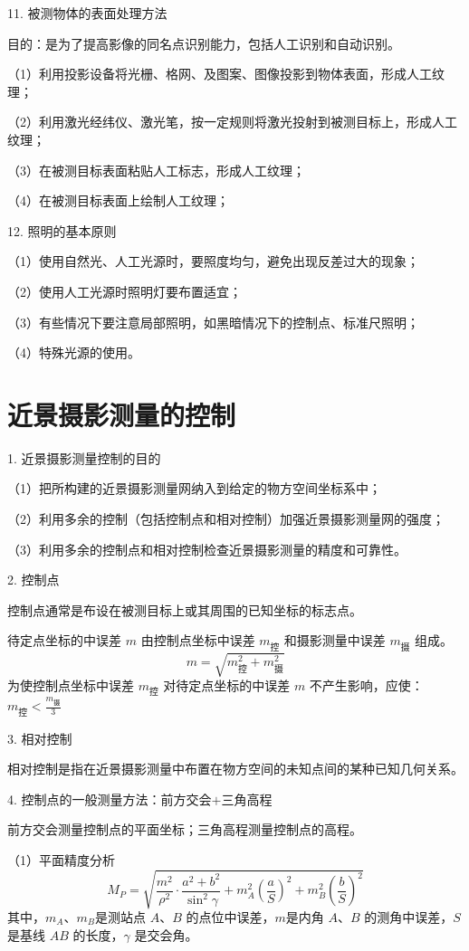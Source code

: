 \documentclass[a4paper]{ctexart}
\begin{document}
11. 被测物体的表面处理方法

目的：是为了提高影像的同名点识别能力，包括人工识别和自动识别。

（1）利用投影设备将光栅、格网、及图案、图像投影到物体表面，形成人工纹理；

（2）利用激光经纬仪、激光笔，按一定规则将激光投射到被测目标上，形成人工纹理；

（3）在被测目标表面粘贴人工标志，形成人工纹理；

（4）在被测目标表面上绘制人工纹理；

12. 照明的基本原则

（1）使用自然光、人工光源时，要照度均匀，避免出现反差过大的现象； 

（2）使用人工光源时照明灯要布置适宜；

（3）有些情况下要注意局部照明，如黑暗情况下的控制点、标准尺照明；

（4）特殊光源的使用。
\newpage
\section{近景摄影测量的控制}
1. 近景摄影测量控制的目的

（1）把所构建的近景摄影测量网纳入到给定的物方空间坐标系中；

（2）利用多余的控制（包括控制点和相对控制）加强近景摄影测量网的强度；

（3）利用多余的控制点和相对控制检查近景摄影测量的精度和可靠性。

2. 控制点

控制点通常是布设在被测目标上或其周围的已知坐标的标志点。

待定点坐标的中误差 $m$ 由控制点坐标中误差 $m_\text{控}$ 和摄影测量中误差 $m_\text{摄}$ 组成。
$$
m=\sqrt{m_{\text{控}}^{2}+m_{\text{摄}}^{2}}
$$
为使控制点坐标中误差 $m_\text{控}$ 对待定点坐标的中误差 $m$ 不产生影响，应使：$m_\text{控}<\frac{m_\text{摄}}{3}$

3. 相对控制

相对控制是指在近景摄影测量中布置在物方空间的未知点间的某种已知几何关系。

4. 控制点的一般测量方法：前方交会$+$三角高程

前方交会测量控制点的平面坐标；三角高程测量控制点的高程。

（1）平面精度分析
$$
M_P=\sqrt{\frac{m^2}{\rho ^2}\cdot \frac{a^2+b^2}{\sin ^2\gamma}+m_{A}^{2}\left( \frac{a}{S} \right) ^2+m_{B}^{2}\left( \frac{b}{S} \right) ^2}
$$
其中，$m_A$、$m_B$是测站点 $A$、$B$ 的点位中误差，$m$是内角 $A$、$B$ 的测角中误差，$S$是基线 $AB$ 的长度，$\gamma$ 是交会角。
\end{document}

